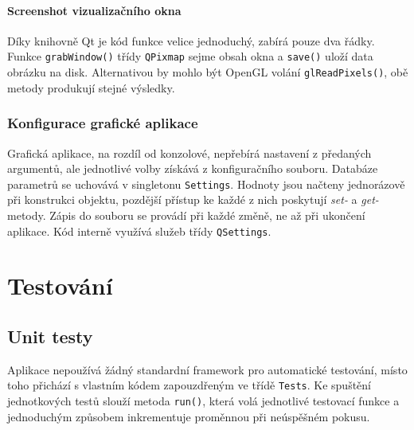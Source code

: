\documentclass[11pt,twoside,a4paper]{book}
\begin{document}
\subsubsection{Screenshot vizualizačního okna}

Díky knihovně Qt je kód funkce velice jednoduchý, zabírá pouze dva řádky. Funkce \texttt{grab\-Win\-dow()} třídy \texttt{QPixmap} sejme obsah okna a \texttt{save()} uloží data obrázku na disk. Alternativou by mohlo být OpenGL volání \texttt{glReadPixels()}, obě metody produkují stejné výsledky.


\subsection{Konfigurace grafické aplikace}

Grafická aplikace, na rozdíl od konzolové, nepřebírá nastavení z předaných argumentů, ale jednotlivé volby získává z konfiguračního souboru. Databáze parametrů se uchovává v singletonu \texttt{Settings}. Hodnoty jsou načteny jednorázově při konstrukci objektu, pozdější přístup ke každé z nich poskytují \textit{set-} a \textit{get-} metody. Zápis do souboru se provádí při každé změně, ne až při ukončení aplikace. Kód interně využívá služeb třídy \texttt{QSettings}.




\chapter{Testování}


\section{Unit testy}
\label{unit_testy}

Aplikace nepoužívá žádný standardní framework pro automatické testování, místo toho při\-chá\-zí s vlastním kódem zapouzdřeným ve třídě \texttt{Tests}. Ke spuštění jednotkových testů slouží metoda \texttt{run()}, která volá jednotlivé testovací funkce a jednoduchým způsobem inkrementuje proměnnou při neúspěšném pokusu.
\end{document}
